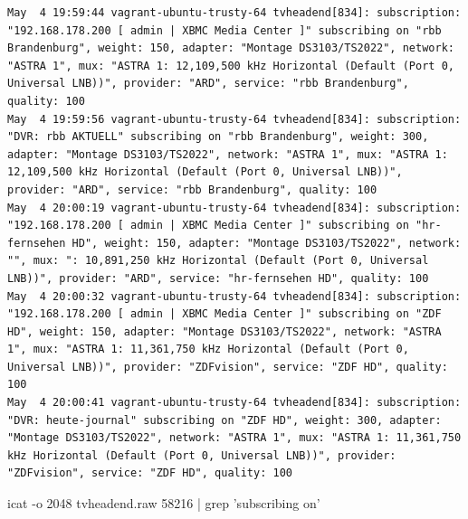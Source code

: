 \begin{cmd}[H]
\begin{Verbatim}[fontsize=\tiny]
May  4 19:59:44 vagrant-ubuntu-trusty-64 tvheadend[834]: subscription: "192.168.178.200 [ admin | XBMC Media Center ]" subscribing on "rbb Brandenburg", weight: 150, adapter: "Montage DS3103/TS2022", network: "ASTRA 1", mux: "ASTRA 1: 12,109,500 kHz Horizontal (Default (Port 0, Universal LNB))", provider: "ARD", service: "rbb Brandenburg", quality: 100
May  4 19:59:56 vagrant-ubuntu-trusty-64 tvheadend[834]: subscription: "DVR: rbb AKTUELL" subscribing on "rbb Brandenburg", weight: 300, adapter: "Montage DS3103/TS2022", network: "ASTRA 1", mux: "ASTRA 1: 12,109,500 kHz Horizontal (Default (Port 0, Universal LNB))", provider: "ARD", service: "rbb Brandenburg", quality: 100
May  4 20:00:19 vagrant-ubuntu-trusty-64 tvheadend[834]: subscription: "192.168.178.200 [ admin | XBMC Media Center ]" subscribing on "hr-fernsehen HD", weight: 150, adapter: "Montage DS3103/TS2022", network: "", mux: ": 10,891,250 kHz Horizontal (Default (Port 0, Universal LNB))", provider: "ARD", service: "hr-fernsehen HD", quality: 100
May  4 20:00:32 vagrant-ubuntu-trusty-64 tvheadend[834]: subscription: "192.168.178.200 [ admin | XBMC Media Center ]" subscribing on "ZDF HD", weight: 150, adapter: "Montage DS3103/TS2022", network: "ASTRA 1", mux: "ASTRA 1: 11,361,750 kHz Horizontal (Default (Port 0, Universal LNB))", provider: "ZDFvision", service: "ZDF HD", quality: 100
May  4 20:00:41 vagrant-ubuntu-trusty-64 tvheadend[834]: subscription: "DVR: heute-journal" subscribing on "ZDF HD", weight: 300, adapter: "Montage DS3103/TS2022", network: "ASTRA 1", mux: "ASTRA 1: 11,361,750 kHz Horizontal (Default (Port 0, Universal LNB))", provider: "ZDFvision", service: "ZDF HD", quality: 100
\end{Verbatim}
\caption{icat -o 2048 tvheadend.raw 58216 | grep 'subscribing on'}
\label{cmd:tvheadend-subscription}
\end{cmd}

